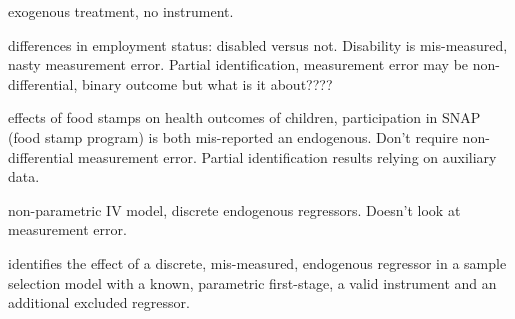 \cite{HasseltBollinger} exogenous treatment, no instrument.


\cite{kreider2007} differences in employment status: disabled versus not. Disability is mis-measured, nasty measurement error. Partial identification, measurement error may be non-differential, binary outcome but what is it about????

\cite{kreider2012} effects of food stamps on health outcomes of children, participation in SNAP (food stamp program) is both mis-reported an endogenous.
Don't require non-differential measurement error.
Partial identification results relying on auxiliary data.

\cite{das2005} non-parametric IV model, discrete endogenous regressors. Doesn't look at measurement error.


\cite{shiu2015} identifies the effect of a discrete, mis-measured, endogenous regressor in a sample selection model with a known, parametric first-stage, a valid instrument and an additional excluded regressor.  




